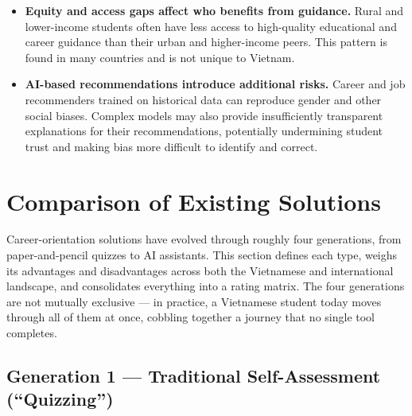 \documentclass[a4paper]{article}
\begin{document}
\begin{itemize}
    \item \textbf{Equity and access gaps affect who benefits from guidance.} Rural and lower-income students often have less access to high-quality educational and career guidance than their urban and higher-income peers. This pattern is found in many countries and is not unique to Vietnam.
    \item \textbf{AI-based recommendations introduce additional risks.} Career and job recommenders trained on historical data can reproduce gender and other social biases. Complex models may also provide insufficiently transparent explanations for their recommendations, potentially undermining student trust and making bias more difficult to identify and correct.
\end{itemize}

\section{Comparison of Existing Solutions}

Career-orientation solutions have evolved through roughly four generations, from
paper-and-pencil quizzes to AI assistants. This section defines each type, weighs its
advantages and disadvantages across both the Vietnamese and international landscape, and
consolidates everything into a rating matrix. The four generations are not mutually
exclusive — in practice, a Vietnamese student today moves through all of them at once,
cobbling together a journey that no single tool completes.

\subsection{Generation 1 --- Traditional Self-Assessment (``Quizzing'')}
\end{document}
